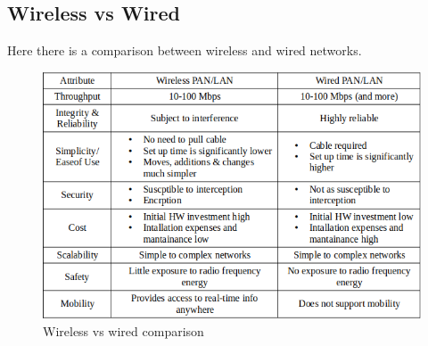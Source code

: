 \subsection{Wireless vs Wired}
Here there is a comparison between wireless and wired networks.\\
\begin{figure}[!h] 
    \centering 
    \includegraphics[scale = 0.55]{images/wireless-vs-wired-comparison.png}
    \caption{Wireless vs wired comparison}
    \label{wireless-vs-wired-comparison}
\end{figure}